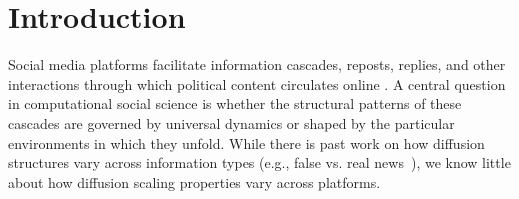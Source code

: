 \documentclass[letterpaper]{article} %
\newcommand{\cb}[1]{\textcolor{blue}{CB: #1}}
\begin{document}
\section{Introduction}
Social media platforms facilitate information cascades, reposts, replies, and other interactions through which political content circulates online \cite{easley_networks_2010, gruhl_information_2004, guille_information_2013}. 
A central question in computational social science is whether the structural patterns of these cascades are governed by universal dynamics or shaped by the particular environments in which they unfold. While there is past work on how diffusion structures vary across information types (e.g., false vs. real news~\citep{vosoughi_spread_2018}), 
we know little about how diffusion scaling properties vary across platforms.

\end{document}

